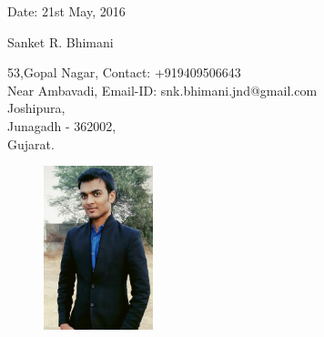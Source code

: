 \documentclass[12pt,a4paper,english]{article}
\begin{document}
	\begin{flushleft}
		Date: 21st May, 2016
	\end{flushleft}
	\begin{center}
		\huge{Sanket R. Bhimani}	
	\end{center}
	\hline
	\begin{flushleft}
		53,Gopal Nagar, \hspace{2.57in}Contact: +919409506643\\
		Near Ambavadi,	\hspace{2.57in}Email-ID: snk.bhimani.jnd@gmail.com\\
		Joshipura,\\
		Junagadh - 362002,\\
		Gujarat.
	\end{flushleft}
	\vspace{-0.6in}
	\begin{figure}[h]
		\begin{flushright}
			\includegraphics[width=120px]{sanket.jpg}
		\end{flushright}
	\end{figure}
	\hline
\end{document}
